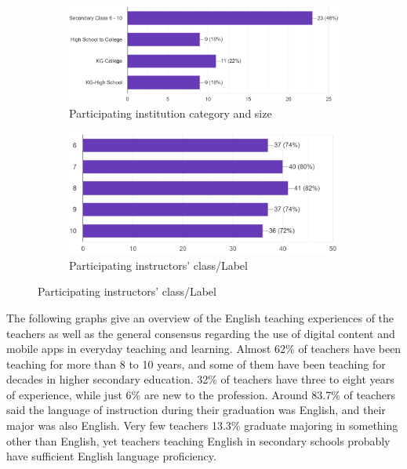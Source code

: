 \documentclass[sn-mathphys,Numbered]{sn-jnl}%
\theoremstyle{thmstyleone}%
\theoremstyle{thmstyletwo}%
\theoremstyle{thmstylethree}%
\begin{document}
\begin{figure}[h!]
\centering
\begin{subfigure}{0.48\textwidth}
    \includegraphics[width=\textwidth]{institution_size.png}
    \caption{Participating institution category and size}
    \label{cv}
\end{subfigure}
\hfill
\begin{subfigure}{0.48\textwidth}
    \includegraphics[width=\textwidth]{english_teaching_class.png}
    \caption{Participating instructors' class/Label}
    \label{umass}
\end{subfigure}       
\label{cv_umass}
\end{figure}

The following graphs give an overview of the English teaching experiences of the teachers as well as the general consensus regarding the use of digital content and mobile apps in everyday teaching and learning. Almost 62\% of teachers have been teaching for more than 8 to 10 years, and some of them have been teaching for decades in higher secondary education. 32\% of teachers have three to eight years of experience, while just 6\% are new to the profession. Around 83.7\% of teachers said the language of instruction during their graduation was English, and their major was also English. Very few teachers 13.3\% graduate majoring in something other than English, yet teachers teaching English in secondary schools probably have sufficient English language proficiency.\\
\end{document}
